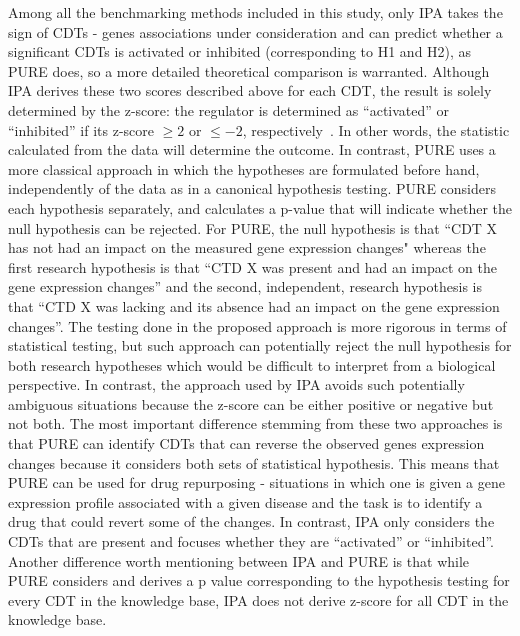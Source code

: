 Among all the benchmarking methods included in this study, only IPA takes the sign of CDTs - genes associations under consideration and can predict whether a significant CDTs is activated or inhibited (corresponding to H1 and H2), as PURE does, so a more detailed theoretical comparison is warranted.
Although IPA derives these two scores  described above for each CDT, the result is solely determined by the z-score: the regulator is determined as ``activated''  or ``inhibited'' if its z-score $\geq 2$ or $\leq -2$, respectively~\cite{kramer2013causal}. In other words, the statistic calculated from the data will determine the outcome. In contrast, PURE uses a more classical approach in which the hypotheses are formulated before hand, independently of the data as in a canonical hypothesis testing. PURE considers each hypothesis separately, and calculates a p-value that will indicate whether the null hypothesis can be rejected. 
For PURE, the null hypothesis is that ``CDT X has not had an impact on the measured gene expression changes" whereas the first research hypothesis is that ``CTD X was present and had an impact on the gene expression changes'' and the second, independent, research hypothesis is that ``CTD X was lacking and its absence had an impact on the gene expression changes''. 
The testing done in the proposed approach is more rigorous in terms of statistical testing, but such approach can potentially reject the null hypothesis for both research hypotheses which would be difficult to interpret from a biological perspective. In contrast, the approach used by IPA avoids such potentially ambiguous situations because the z-score can be either positive or negative but not both. The most important difference stemming from these two approaches is that PURE can identify CDTs that can reverse the observed genes expression changes because it considers both sets of statistical hypothesis. This means that PURE can be used for drug repurposing - situations in which one is given a   gene expression profile associated with a given disease and the task is to identify a drug that could revert some of the changes. In contrast, IPA only considers the CDTs that are present and focuses whether they are ``activated'' or ``inhibited''. 
Another  difference worth mentioning between IPA and PURE is that while PURE considers and derives a p value corresponding to the hypothesis testing for every CDT in the knowledge base, IPA does not derive z-score for all CDT in the knowledge base. %

